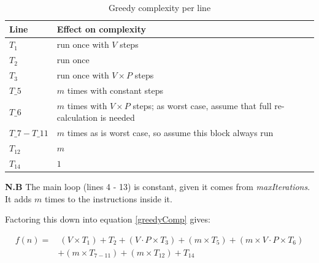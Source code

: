 \documentclass[12pt]{report}
\begin{document}
\begin{table}[H]
\centering
\caption{Greedy complexity per line}
\label{greedyLines}
\begin{tabular}{@{}|l|l|@{}}
\toprule
Line               & Effect on complexity                                                                        \\ \midrule
$T_1$              & run once with $V$ steps                                                                     \\ \midrule
$T_2$              & run once                                                                                    \\ \midrule
$T_3$              & run once with $V \times P$ steps                                                            \\ \midrule
$T\_5$             & $m$ times with constant steps                                                               \\ \midrule
$T\_6$             & $m$ times with $V \times P$ steps; as worst case, assume that full re-calculation is needed \\ \midrule
$T\_7 - T\_{11}$ & $m$ times as is worst case, so assume this block always run                                 \\ \midrule
$T_{12}$           & $m$                                                                                         \\ \midrule
$T_{14}$           & $1$                                                                                         \\ \bottomrule
\end{tabular}
\end{table}

\textbf{N.B} The main loop (lines 4 - 13) is constant, given it comes from \textit{maxIterations}. It adds $m$ times to the instructions inside it.

Factoring this down into equation \ref{greedyComp} gives: 

\begin{equation}\label{greedyComp}
\begin{aligned}
	f(n) ={} & \ (V \times T_1) + T_2 + (V \cdot P \times T_3) + (m \times T_5) + (m \times V \cdot P \times T_6) \\
	 	& + (m \times T_{7 - 11}) + (m \times T_{12}) + T_{14}
\end{aligned}
\end{equation}
\end{document}
